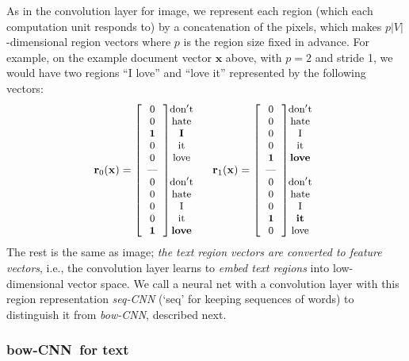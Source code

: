 \documentclass[11pt,letterpaper]{article}
\newcommand{\scnn}{seq-CNN}
\newcommand{\bcnn}{bow-CNN}
\newcommand{\bx}{{\mathbf x}}
\newcommand{\psz}{p}
\newcommand{\voc}{V}
\newcommand{\vsz}{|\voc|}
\newcommand{\region}{{\mathbf r}} %
\newcommand{\bEqsz}{\begin{small}}
\newcommand{\eEqsz}{\end{small}}
\begin{document}
As in the convolution layer for image, we 
represent each region (which each computation unit responds to) 
by a concatenation of the pixels, 
which makes $\psz\vsz$-dimensional region vectors where $\psz$ is the region size 
fixed in advance.  
For example, on the example document vector $\bx$ above, with $\psz=2$ and stride 1, 
we would have two regions 
``I love'' and ``love it'' represented by the following vectors: 
\[
\bEqsz
\region_0(\bx)=  %
\left[ 
  \begin{array}{c} 0 \cr 0 \cr{\bf 1}\cr 0 \cr 0 \cr \mbox{---} \cr 0 \cr 0 \cr 0 \cr 0 \cr {\bf 1} \cr \end{array} 
\right]
\hspace{-0.1in}
  \begin{array}{c} {\rm don't}\cr{\rm hate}\cr{\rm \bf I}\cr{\rm it}\cr{\rm love}\cr   \cr  
                   {\rm don't}\cr{\rm hate}\cr{\rm I}\cr{\rm it}\cr{\rm \bf love}\cr \end{array} 
~~~~                   
\region_1(\bx)=  %
\left[ 
  \begin{array}{c}  0 \cr 0 \cr 0 \cr 0 \cr {\bf 1} \cr \mbox{---} \cr 0 \cr 0 \cr 0 \cr{\bf 1}\cr 0 \cr \end{array} 
\right]
\hspace{-0.1in}
  \begin{array}{c} {\rm don't}\cr{\rm hate}\cr{\rm I}\cr{\rm it}\cr{\rm \bf love}\cr   \cr  
                   {\rm don't}\cr{\rm hate}\cr{\rm I}\cr{\rm \bf it}\cr{\rm love}\cr \end{array}       
\eEqsz
\]
The rest is the same as image; 
{\em the text region vectors are converted to feature vectors}, 
i.e., 
the convolution layer learns to {\em embed text regions} into low-dimensional vector space.   
We call a neural net with a convolution layer with this region representation 
{\em \scnn} (`seq' for keeping sequences of words) 
to distinguish it from {\em \bcnn}, described next.  

\subsubsection{\bcnn\ for text} 
\label{sec:bowconv}
\end{document}
